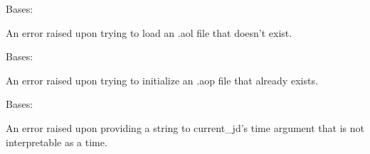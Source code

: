 \documentclass[letterpaper,10pt,english]{sphinxmanual}
\begin{document}
\begin{fulllineitems}
\label{\detokenize{autoapi/aop/tools/index:aop.tools.AolNotFoundError}}
\pysigstartsignatures
{}
\pysigstopsignatures
\sphinxAtStartPar
Bases: 

\sphinxAtStartPar
An error raised upon trying to load an .aol file that doesn’t exist.

\end{fulllineitems}


\begin{fulllineitems}
\label{\detokenize{autoapi/aop/tools/index:aop.tools.AopFileAlreadyExistsError}}
\pysigstartsignatures
{}
\pysigstopsignatures
\sphinxAtStartPar
Bases: 

\sphinxAtStartPar
An error raised upon trying to initialize an .aop file that already exists.

\end{fulllineitems}


\begin{fulllineitems}
\label{\detokenize{autoapi/aop/tools/index:aop.tools.InvalidTimeStringError}}
\pysigstartsignatures
{}
\pysigstopsignatures
\sphinxAtStartPar
Bases: 

\sphinxAtStartPar
An error raised upon providing a string to current\_jd’s time argument that is not interpretable as a time.

\end{fulllineitems}
\end{document}
